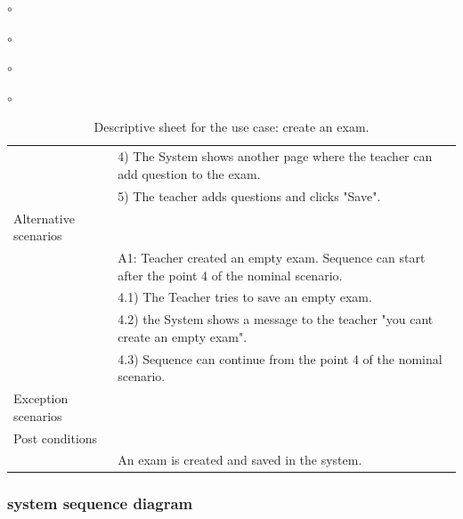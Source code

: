 \documentclass[]{uc2pfecaneva}
\begin{document}
\begin{list}{$\circ$}{}
\begin{list}{$\circ$}{}
\begin{list}{$\circ$}{}
\begin{list}{$\circ$}{}
\begin{table}[h]
\begin{tabularx}{\textwidth}{|l|X|}
            & 4) The System shows another page where the teacher can add question to the exam.                            \\
            & 5) The teacher  adds questions and clicks "Save".                                                           \\ \hline
            Alternative scenarios &                                                                                                             \\
            & A1: Teacher created an empty exam. Sequence can start after the point 4 of the nominal scenario.            \\
            & \hspace{4mm}4.1) The Teacher tries to save an empty exam.                                                    \\
            & \hspace{4mm}4.2) the System shows a message to the teacher "you cant create an empty exam".                  \\
            & \hspace{4mm}4.3) Sequence can continue from the point 4 of the nominal scenario.                             \\ \hline
            Exception scenarios   &                                                                                                             \\ \hline
            Post conditions       &                                                                                                             \\
            & An exam is created and saved in the system.                                                                 \\ \hline
        \end{tabularx}
        \caption{Descriptive sheet for the use case: create an exam.}
        \label{table:3}
    \end{table}
    \clearpage

    \subsubsection{system sequence diagram}
    \begin{figure}[h]


\end{figure}
\end{list}
\end{list}
\end{list}
\end{list}
\end{document}
